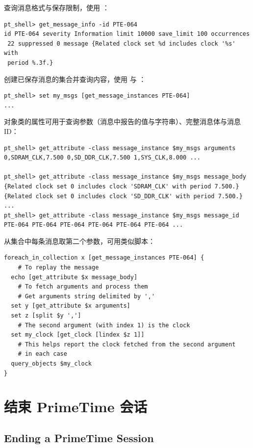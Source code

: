 查询消息格式与保存限制，使用 ：
\begin{lstlisting}
pt_shell> get_message_info -id PTE-064
id PTE-064 severity Information limit 10000 save_limit 100 occurrences
 22 suppressed 0 message {Related clock set %d includes clock '%s' with
 period %.3f.}
\end{lstlisting}

创建已保存消息的集合并查询内容，使用  与 ：
\begin{lstlisting}
pt_shell> set my_msgs [get_message_instances PTE-064]
...
\end{lstlisting}

 对象类的属性可用于查询参数（消息中报告的值与字符串）、完整消息体与消息 ID：
\begin{lstlisting}
pt_shell> get_attribute -class message_instance $my_msgs arguments
0,SDRAM_CLK,7.500 0,SD_DDR_CLK,7.500 1,SYS_CLK,8.000 ...

pt_shell> get_attribute -class message_instance $my_msgs message_body
{Related clock set 0 includes clock 'SDRAM_CLK' with period 7.500.}
{Related clock set 0 includes clock 'SD_DDR_CLK' with period 7.500.}
...
pt_shell> get_attribute -class message_instance $my_msgs message_id
PTE-064 PTE-064 PTE-064 PTE-064 PTE-064 PTE-064 ...
\end{lstlisting}

从集合中每条消息取第二个参数，可用类似脚本：
\begin{lstlisting}
foreach_in_collection x [get_message_instances PTE-064] {
    # To replay the message
  echo [get_attribute $x message_body]
    # To fetch arguments and process them
    # Get arguments string delimited by ','
  set y [get_attribute $x arguments]
  set z [split $y ',']
    # The second argument (with index 1) is the clock
  set my_clock [get_clock [lindex $z 1]]
    # This helps report the clock fetched from the second argument
    # in each case
  query_objects $my_clock
}
\end{lstlisting}

\section{结束 PrimeTime 会话}
\subsection*{Ending a PrimeTime Session}

